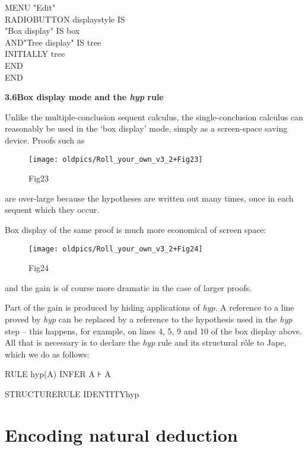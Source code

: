 \documentclass[11pt]{book}
\newcommand{\tab}{\hspace{5mm}}
\begin{document}
MENU "Edit"\\
\tab RADIOBUTTON displaystyle IS\\
\tab \tab "Box display" \tab IS box\\
\tab AND\tab "Tree display" \tab IS tree\\
\tab INITIALLY tree\\
\tab END\\
END


\textbf{{\large 3.6\tab Box display mode and the \textit{hyp} rule}}


Unlike the multiple-conclusion sequent calculus, the single-conclusion calculus can reasonably be used in the `box display' mode, simply as a screen-space saving device. Proofs such as

\begin{figure}[htbp]
\begin{center}
\texttt{[image: oldpics/Roll\_your\_own\_v3\_2+Fig23]}
\caption{Fig23}
\end{center}
\end{figure}


are over-large because the hypotheses are written out many times, once in each sequent which they occur.


Box display of the same proof is much more economical of screen space:

\begin{figure}[htbp]
\begin{center}
\texttt{[image: oldpics/Roll\_your\_own\_v3\_2+Fig24]}
\caption{Fig24}
\end{center}
\end{figure}


and the gain is of course more dramatic in the case of larger proofs.


Part of the gain is produced by hiding applications of \textit{hyp}. A reference to a line proved by \textit{hyp} can be replaced by a reference to the hypothesis used in the \textit{hyp} step -- this happens, for example, on lines 4, 5, 9 and 10 of the box display above. All that is necessary is to declare the \textit{hyp} rule and its structural r\^{o}le to Jape, which we do as follows:

RULE hyp(A) INFER A ⊦ A

STRUCTURERULE IDENTITY\tab hyp



\chapter{Encoding natural deduction}
\end{document}
